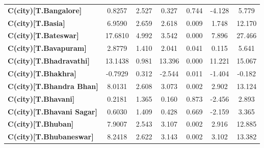 \begin{center}
\begin{tabular}{lcccccc}
\textbf{C(city)[T.Bangalore]}                                                                       &       0.8257  &        2.527     &     0.327  &         0.744        &       -4.128    &        5.779     \\
\textbf{C(city)[T.Basia]}                                                                           &       6.9590  &        2.659     &     2.618  &         0.009        &        1.748    &       12.170     \\
\textbf{C(city)[T.Bateswar]}                                                                        &      17.6810  &        4.992     &     3.542  &         0.000        &        7.896    &       27.466     \\
\textbf{C(city)[T.Bavapuram]}                                                                       &       2.8779  &        1.410     &     2.041  &         0.041        &        0.115    &        5.641     \\
\textbf{C(city)[T.Bhadravathi]}                                                                     &      13.1438  &        0.981     &    13.396  &         0.000        &       11.221    &       15.067     \\
\textbf{C(city)[T.Bhakhra]}                                                                         &      -0.7929  &        0.312     &    -2.544  &         0.011        &       -1.404    &       -0.182     \\
\textbf{C(city)[T.Bhandra Bhan]}                                                                    &       8.0131  &        2.608     &     3.073  &         0.002        &        2.902    &       13.124     \\
\textbf{C(city)[T.Bhavani]}                                                                         &       0.2181  &        1.365     &     0.160  &         0.873        &       -2.456    &        2.893     \\
\textbf{C(city)[T.Bhavani Sagar]}                                                                   &       0.6030  &        1.409     &     0.428  &         0.669        &       -2.159    &        3.365     \\
\textbf{C(city)[T.Bhuban]}                                                                          &       7.9007  &        2.543     &     3.107  &         0.002        &        2.916    &       12.885     \\
\textbf{C(city)[T.Bhubaneswar]}                                                                     &       8.2418  &        2.622     &     3.143  &         0.002        &        3.102    &       13.382     \\

\end{tabular}
\end{center}
